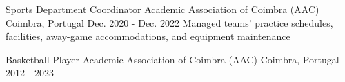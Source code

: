 

\begin{cventries}

  \cventry
    {Sports Department Coordinator} %
    {Academic Association of Coimbra (AAC)} %
    {Coimbra, Portugal} %
    {Dec. 2020 - Dec. 2022} %
    {
      Managed teams' practice schedules, facilities, away-game accommodations, and equipment maintenance
    }

  \cventry
    {Basketball Player} %
    {Academic Association of Coimbra (AAC)} %
    {Coimbra, Portugal} %
    {2012 - 2023} %
    {}

\end{cventries}
